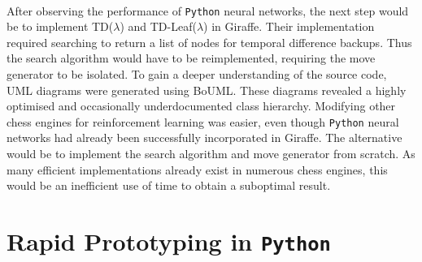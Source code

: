 \documentclass[12pt,a4paper]{book}
\begin{document}

\paragraph{} After observing the performance of \texttt{Python} neural networks, the next step would be to implement TD($\lambda$) and TD-Leaf($\lambda$) in Giraffe. Their implementation required searching to return a list of nodes for temporal difference backups. Thus the search algorithm would have to be reimplemented, requiring the move generator to be isolated. To gain a deeper understanding of the source code, UML diagrams were generated using BoUML. These diagrams revealed a highly optimised and occasionally underdocumented class hierarchy. Modifying other chess engines for reinforcement learning was easier, even though \texttt{Python} neural networks had already been successfully incorporated in Giraffe. The alternative would be to implement the search algorithm and move generator from scratch. As many efficient implementations already exist in numerous chess engines, this would be an inefficient use of time to obtain a suboptimal result.

\section{Rapid Prototyping in  \texttt{Python}}

\end{document}
